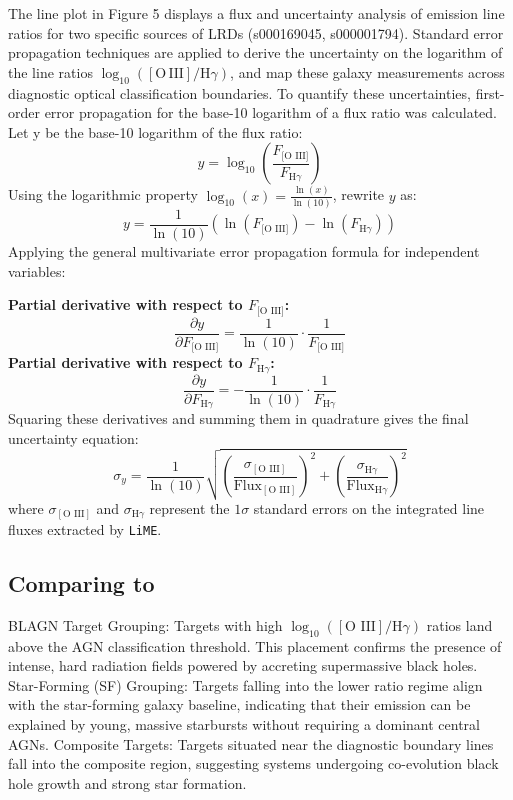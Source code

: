 \documentclass[twoside,twocolumn,10pt]{article}
\begin{document}
\fontsize{12}{14}\selectfont
The line plot in Figure 5 displays a flux and uncertainty analysis of emission line ratios for two specific sources of LRDs (s000169045, s000001794). Standard error propagation techniques are applied to derive the uncertainty on the logarithm of the line ratios $\log_{10}([\mathrm{O\,III}] / \mathrm{H}\gamma)$, and map these galaxy measurements across diagnostic optical classification boundaries. To quantify these uncertainties, first-order error propagation for the base-10 logarithm of a flux ratio was calculated. Let y be the base-10 logarithm of the flux ratio: 
$$y = \log_{10}\left(\frac{F_{\text{[O III]}}}{F_{\text{H}\gamma}}\right)$$
Using the logarithmic property $\log_{10}(x)=\frac{\ln(x)}{\ln(10)}$, rewrite $y$ as:
$$y = \frac{1}{\ln(10)} \left( \ln(F_{\text{[O III]}}) - \ln(F_{\text{H}\gamma}) \right)$$
Applying the general multivariate error propagation formula for independent variables:

\textbf{Partial derivative with respect to $F_{\text{[O III]}}$:}
$$\frac{\partial y}{\partial F_{\text{[O III]}}} = \frac{1}{\ln(10)} \cdot \frac{1}{F_{\text{[O III]}}}$$
\textbf{Partial derivative with respect to $F_{\text{H}\gamma}$:}
$$\frac{\partial y}{\partial F_{\text{H}\gamma}} = -\frac{1}{\ln(10)} \cdot \frac{1}{F_{\text{H}\gamma}}$$
Squaring these derivatives and summing them in quadrature gives the final uncertainty equation:
$$\sigma_y = \frac{1}{\ln(10)} \sqrt{ \left( \frac{\sigma_{[\text{O III}]}}{\text{Flux}_{[\text{O III}]}} \right)^2 + \left( \frac{\sigma_{\text{H}\gamma}}{\text{Flux}_{\text{H}\gamma}} \right)^2 }$$ where $\sigma_{[\text{O III}]}$ and $\sigma_{\text{H}\gamma}$ represent the $1\sigma$ standard errors on the integrated line fluxes extracted by \texttt{LiME}.

\subsection{Comparing to \citet{Backhaus2025}}
\fontsize{12}{14}\selectfont
    BLAGN Target Grouping: Targets with high $\log_{10}([\text{O III}]/\text{H}\gamma)$ ratios land above the \citet{Backhaus2025} AGN classification threshold. This placement confirms the presence of intense, hard radiation fields powered by accreting supermassive black holes. Star-Forming (SF) Grouping: Targets falling into the lower ratio regime align with the star-forming galaxy baseline, indicating that their emission can be explained by young, massive starbursts without requiring a dominant central AGNs. Composite Targets: Targets situated near the diagnostic boundary lines fall into the composite region, suggesting systems undergoing co-evolution black hole growth and strong star formation.
\end{document}
